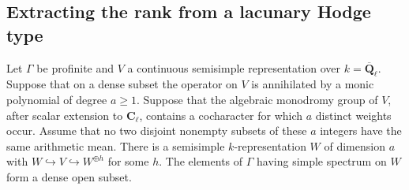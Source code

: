 \subsection{Extracting the rank from a lacunary Hodge type}

\begin{proposition}\label{famgal:rank}
Let \(\Gamma\) be profinite and \(V\) a continuous semisimple representation
over \(k=\overline{\mathbf Q}_\ell\). Suppose that on a dense subset the
operator on \(V\) is annihilated by a monic polynomial of degree \(a\ge1\).
Suppose that the algebraic monodromy group of \(V\), after scalar extension
to \(\mathbf C_\ell\), contains a cocharacter for which \(a\) distinct
weights occur. Assume that no two disjoint nonempty subsets of these
\(a\) integers have the same arithmetic mean. There is a semisimple
\(k\)-representation \(W\) of dimension \(a\) with
\(W\hookrightarrow V\hookrightarrow W^{\oplus h}\) for some \(h\).
The elements of \(\Gamma\) having simple spectrum on \(W\) form a dense
open subset.
\end{proposition}
